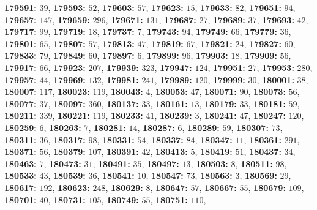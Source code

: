 \textsf{\bfseries 179591:} $39$, \textsf{\bfseries 179593:} $52$, \textsf{\bfseries 179603:} $57$, \textsf{\bfseries 179623:} $15$, \textsf{\bfseries 179633:} $82$, \textsf{\bfseries 179651:} $94$, \textsf{\bfseries 179657:} $147$, \textsf{\bfseries 179659:} $296$, \textsf{\bfseries 179671:} $131$, \textsf{\bfseries 179687:} $27$, \textsf{\bfseries 179689:} $37$, \textsf{\bfseries 179693:} $42$, \textsf{\bfseries 179717:} $99$, \textsf{\bfseries 179719:} $18$, \textsf{\bfseries 179737:} $7$, \textsf{\bfseries 179743:} $94$, \textsf{\bfseries 179749:} $66$, \textsf{\bfseries 179779:} $36$, \textsf{\bfseries 179801:} $65$, \textsf{\bfseries 179807:} $57$, \textsf{\bfseries 179813:} $47$, \textsf{\bfseries 179819:} $67$, \textsf{\bfseries 179821:} $24$, \textsf{\bfseries 179827:} $60$, \textsf{\bfseries 179833:} $79$, \textsf{\bfseries 179849:} $60$, \textsf{\bfseries 179897:} $6$, \textsf{\bfseries 179899:} $96$, \textsf{\bfseries 179903:} $18$, \textsf{\bfseries 179909:} $56$, \textsf{\bfseries 179917:} $66$, \textsf{\bfseries 179923:} $207$, \textsf{\bfseries 179939:} $323$, \textsf{\bfseries 179947:} $124$, \textsf{\bfseries 179951:} $27$, \textsf{\bfseries 179953:} $280$, \textsf{\bfseries 179957:} $44$, \textsf{\bfseries 179969:} $132$, \textsf{\bfseries 179981:} $241$, \textsf{\bfseries 179989:} $120$, \textsf{\bfseries 179999:} $30$, \textsf{\bfseries 180001:} $38$, \textsf{\bfseries 180007:} $117$, \textsf{\bfseries 180023:} $119$, \textsf{\bfseries 180043:} $4$, \textsf{\bfseries 180053:} $47$, \textsf{\bfseries 180071:} $90$, \textsf{\bfseries 180073:} $56$, \textsf{\bfseries 180077:} $37$, \textsf{\bfseries 180097:} $360$, \textsf{\bfseries 180137:} $33$, \textsf{\bfseries 180161:} $13$, \textsf{\bfseries 180179:} $33$, \textsf{\bfseries 180181:} $59$, \textsf{\bfseries 180211:} $339$, \textsf{\bfseries 180221:} $119$, \textsf{\bfseries 180233:} $41$, \textsf{\bfseries 180239:} $3$, \textsf{\bfseries 180241:} $47$, \textsf{\bfseries 180247:} $120$, \textsf{\bfseries 180259:} $6$, \textsf{\bfseries 180263:} $7$, \textsf{\bfseries 180281:} $14$, \textsf{\bfseries 180287:} $6$, \textsf{\bfseries 180289:} $59$, \textsf{\bfseries 180307:} $73$, \textsf{\bfseries 180311:} $36$, \textsf{\bfseries 180317:} $98$, \textsf{\bfseries 180331:} $54$, \textsf{\bfseries 180337:} $84$, \textsf{\bfseries 180347:} $11$, \textsf{\bfseries 180361:} $291$, \textsf{\bfseries 180371:} $56$, \textsf{\bfseries 180379:} $107$, \textsf{\bfseries 180391:} $42$, \textsf{\bfseries 180413:} $5$, \textsf{\bfseries 180419:} $51$, \textsf{\bfseries 180437:} $34$, \textsf{\bfseries 180463:} $7$, \textsf{\bfseries 180473:} $31$, \textsf{\bfseries 180491:} $35$, \textsf{\bfseries 180497:} $13$, \textsf{\bfseries 180503:} $8$, \textsf{\bfseries 180511:} $98$, \textsf{\bfseries 180533:} $43$, \textsf{\bfseries 180539:} $36$, \textsf{\bfseries 180541:} $10$, \textsf{\bfseries 180547:} $73$, \textsf{\bfseries 180563:} $3$, \textsf{\bfseries 180569:} $29$, \textsf{\bfseries 180617:} $192$, \textsf{\bfseries 180623:} $248$, \textsf{\bfseries 180629:} $8$, \textsf{\bfseries 180647:} $57$, \textsf{\bfseries 180667:} $55$, \textsf{\bfseries 180679:} $109$, \textsf{\bfseries 180701:} $40$, \textsf{\bfseries 180731:} $105$, \textsf{\bfseries 180749:} $55$, \textsf{\bfseries 180751:} $110$, 

